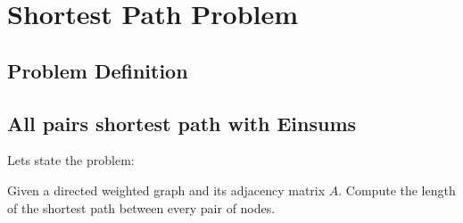 \chapter{Shortest Path Problem}
\section{Problem Definition}
\section{All pairs shortest path with Einsums}
Lets state the problem:
\begin{problem} Given a directed weighted graph and its adjacency matrix $A$. Compute the length of the shortest path between every pair of nodes.

\end{problem}

